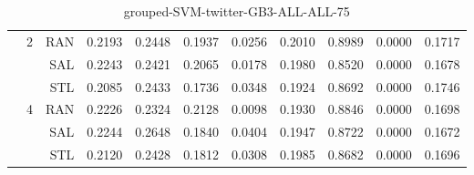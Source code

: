 \begin{center}
\begin{table}[htbp]
\begin{center}
\begin{tabular}{ | r | r | r | r | r | r | r | r | r | r | r |}
 & \multirow{3}{*}{2} & RAN & 0.2193 & 0.2448 & 0.1937 & 0.0256 & 0.2010 & 0.8989 & 0.0000 & 0.1717\\ \cline{3-11}
 &   & SAL & 0.2243 & 0.2421 & 0.2065 & 0.0178 & 0.1980 & 0.8520 & 0.0000 & 0.1678\\ \cline{3-11}
 &   & STL & 0.2085 & 0.2433 & 0.1736 & 0.0348 & 0.1924 & 0.8692 & 0.0000 & 0.1746\\ \cline{2-11}
 & \multirow{3}{*}{4} & RAN & 0.2226 & 0.2324 & 0.2128 & 0.0098 & 0.1930 & 0.8846 & 0.0000 & 0.1698\\ \cline{3-11}
 &   & SAL & 0.2244 & 0.2648 & 0.1840 & 0.0404 & 0.1947 & 0.8722 & 0.0000 & 0.1672\\ \cline{3-11}
 &   & STL & 0.2120 & 0.2428 & 0.1812 & 0.0308 & 0.1985 & 0.8682 & 0.0000 & 0.1696\\ \cline{2-11}
\hline
\end{tabular}
\caption{grouped-SVM-twitter-GB3-ALL-ALL-75}
\end{center}
 \end{table}
\end{center}

